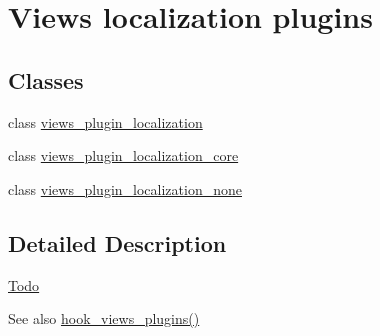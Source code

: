 \hypertarget{group__views__localization__plugins}{
\section{Views localization plugins}
\label{group__views__localization__plugins}
}
\subsection*{Classes}
\begin{DoxyCompactItemize}
\item 
class \hyperlink{classviews__plugin__localization}{views\_\-plugin\_\-localization}
\item 
class \hyperlink{classviews__plugin__localization__core}{views\_\-plugin\_\-localization\_\-core}
\item 
class \hyperlink{classviews__plugin__localization__none}{views\_\-plugin\_\-localization\_\-none}
\end{DoxyCompactItemize}


\subsection{Detailed Description}
\begin{Desc}
\item[\hyperlink{todo__todo000085}{Todo}]\end{Desc}
\begin{DoxySeeAlso}{See also}
\hyperlink{group__views__hooks_ga23f6e9972b2ed84fc54b7ff63f44477d}{hook\_\-views\_\-plugins()} 
\end{DoxySeeAlso}
